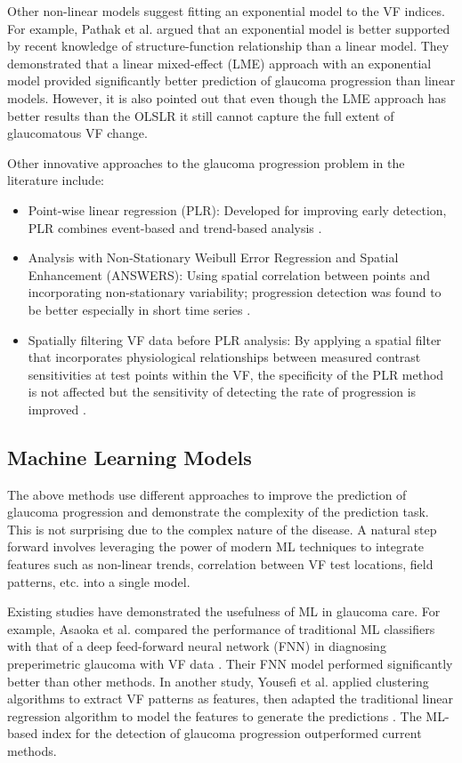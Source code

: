 Other non-linear models suggest fitting an exponential model to the \ac{VF} indices. For example, Pathak et al. argued that an exponential model is better supported by recent knowledge of structure-function relationship than a linear model. \cite{Pathak2013} They demonstrated that a linear mixed-effect (LME) approach with an exponential model provided significantly better prediction of glaucoma progression than linear models. However, it is also pointed out that even though the LME approach has better results than the \ac{OLSLR} it still cannot capture the full extent of glaucomatous \ac{VF} change.

Other innovative approaches to the glaucoma progression problem in the literature include:

\begin{itemize}
	\item Point-wise linear regression (PLR): Developed for improving early detection, PLR combines event-based and trend-based analysis \cite{Nouri-Mahdavi2005}. 
	\item Analysis with Non-Stationary Weibull Error Regression and Spatial Enhancement (ANSWERS): Using spatial correlation between points and incorporating non-stationary variability; progression detection was found to be better especially in short time series \cite{Zhu2015}.
	\item Spatially filtering \ac{VF} data before PLR analysis: By applying a spatial filter that incorporates physiological relationships between measured contrast sensitivities at test points within the VF, the specificity of the PLR method is not affected but the sensitivity of detecting the rate of progression is improved \cite{Strouthidis}.
\end{itemize}

\subsection{Machine Learning Models}

The above methods use different approaches to improve the prediction of glaucoma progression and demonstrate the complexity of the prediction task. This is not surprising due to the complex nature of the disease. A natural step forward involves leveraging the power of modern \ac{ML} techniques to integrate features such as non-linear trends, correlation between \ac{VF} test locations, field patterns, etc. into a single model.
 
Existing studies have demonstrated the usefulness of \ac{ML} in glaucoma care. For example, Asaoka et al. compared the performance of traditional ML classifiers with that of a deep feed-forward neural network (FNN) in diagnosing preperimetric glaucoma with VF data \cite{Asaoka2016}. Their FNN model performed significantly better than other methods. In another study, Yousefi et al. applied clustering algorithms to extract VF patterns as features, then adapted the traditional linear regression algorithm to model the features to generate the predictions \cite{Yousefi2018}. The \ac{ML}-based index for the detection of glaucoma progression outperformed current methods. 

